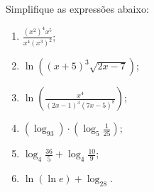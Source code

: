 Simplifique as expressões abaixo:
\begin{enumerate}
	\item $\frac{(x^2)^4x^5}{x^4(x^3)^2}$;
	\item $\ln\left((x+5)^3\sqrt{2x-7}\right)$;
	\item $\ln\left(\frac{x^4}{(2x-1)^3(7x-5)^8}\right)$;
	\item $(\log_93)\cdot\left(\log_5\frac{1}{25}\right)$;
	\item $\log_4\frac{36}{5}+\log_4\frac{10}{9}$;
	\item $\ln(\ln e)+\log_28$.
\end{enumerate}
